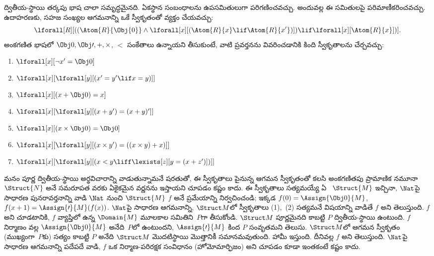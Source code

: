\documentclass[../../../include/open-logic-section]{subfiles}
\begin{document}
ద్వితీయ-స్థాయి తర్కపు భాష చాలా సమృద్ధమైనది. ఏకస్థాన సంబంధాలను
 ఉపసమితులుగా పరిగణించవచ్చు. అందువల్ల ఈ
సమితులపై పరిమాణీకరించవచ్చు. ఉదాహరణకు, సహజ సంఖ్యల ఆగమనాన్ని ఒకే
స్వీకృతంతో వ్యక్తం చేయవచ్చు:
\[
\lforall[R][((\Atom{R}{\Obj{0}} \land \lforall[x][(\Atom{R}{x} \lif
    \Atom{R}{x'})]) \lif \lforall[x][\Atom{R}{x}])].
\]
అంకగణిత భాషలో $\Obj 0, \Obj \prime, +, \times$, $<$ సంకేతాలు
ఉన్నాయని తీసుకుంటే, వాటి ప్రవర్తనను వివరించడానికి కింది స్వీకృతాలను
చేర్చవచ్చు:
\begin{enumerate}
\item $\lforall[x][\lnot x' = \Obj 0]$
\item $\lforall[x][\lforall[y][(x' = y' \lif x = y)]]$
\item $\lforall[x][(x + \Obj 0) = x]$
\item $\lforall[x][\lforall[y][(x + y') = (x + y)']]$
\item $\lforall[x][(x \times \Obj 0) = \Obj 0]$
\item $\lforall[x][\lforall[y][(x \times y') = ((x \times y) + x)]]$
\item $\lforall[x][\lforall[y][(x < y \liff \lexists[z][y = (x + z')])]]$
\end{enumerate}
మనం పూర్ణ ద్వితీయ-స్థాయి అర్థవిచారాన్ని వాడుతున్నామనే షరతుతో, ఈ
స్వీకృతాలు పైనున్న ఆగమన స్వీకృతంతో కలసి అంకగణితపు ప్రామాణిక
నమూనా~$\Struct{N}$ అనే  సమరూపత వరకు ఏకైకమైన వర్ణనను
ఇస్తాయని చూపడం కష్టం కాదు. ఈ స్వీకృతాలు సత్యమయ్యే ఏ
~$\Struct{M}$ ఇచ్చినా, $\Nat$పై సాధారణ పునరావర్తనాన్ని
వాడి $\Nat$ నుంచి $\Struct{M}$  $f$ అనే ప్రమేయాన్ని
నిర్వచించండి; ఇక్కడ $f(0) = \Assign{\Obj 0}{M}$,
$f(x+1) = \Assign{\prime}{M}(f(x))$. $\Nat$పై సాధారణ ఆగమనాన్ని,
$\Struct M$లో స్వీకృతాలు (1),~(2) సత్యమనే విషయాన్ని వాడితే $f$
 అని తెలుస్తుంది. $f$  అని చూడటానికి,
$f$ వ్యాప్తిలో ఉన్న $\Domain{M}$ మూలకాల సమితిని~$P$గా తీసుకోండి.
$\Struct M$ పూర్ణమైనది కాబట్టి $P$ ద్వితీయ-స్థాయి 
ఉంటుంది. $f$ నిర్మాణం వల్ల $\Assign{\Obj 0}{M}$ అనేది~$P$లో
ఉంటుందని, $\Assign{\prime}{M}$ కింద $P$ సంవృతమని తెలుసు.
$\Struct M$లో ఆగమన స్వీకృతం (ముఖ్యంగా~$P$కు) సత్యం కాబట్టి $P$
అనేది $\Struct M$ మొదటిస్థాయి  మొత్తానికీ సమానమవుతుంది.
హామీ ఇస్తుంది. దీనివల్ల $f$  అని తెలుస్తుంది. $\Nat$పై
సాధారణ ఆగమనాన్ని పదేపదే వాడి, $f$ ఒక నిర్మాణ-పరిరక్షక సంవిధానం
(హోమోమార్ఫిజం) అని చూపడం కూడా ఇంతకంటే కష్టం కాదు.
\end{document}
